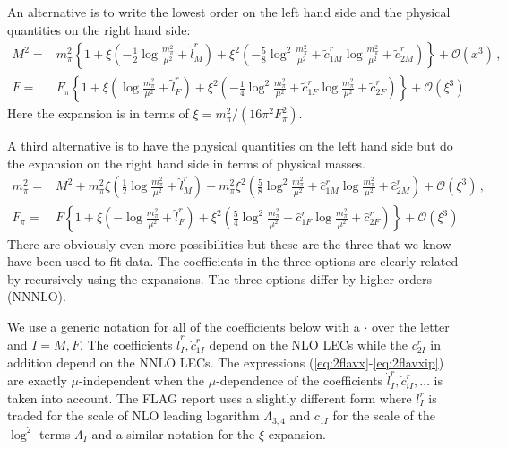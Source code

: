 \documentclass[12pt,a4paper]{article}
\begin{document}
An alternative is to write the lowest order on the left hand side and the physical quantities on the right hand side:
\begin{align}
\label{eq:2flavxi}
M^2 =& m_\pi^2 \left\{ 1 + \xi \left(-\frac{1}{2}\log\frac{m_\pi^2}{\mu^2}+\tilde l_M^r\right)
+ \xi^2 \left(-\frac{5}{8}\log^2\frac{m_\pi^2}{\mu^2}+\tilde c^r_{1M}\log\frac{m_\pi^2}{\mu^2}
+\tilde c^r_{2M}\right) \right\} + \mathcal{O}\left(x^3\right) 
\,,\nonumber\\
F =& F_\pi \left\{ 1 + \xi \left(\log\frac{m_\pi^2}{\mu^2}+\tilde l_F^r\right)
+ \xi^2 \left(-\frac{1}{4}\log^2\frac{m_\pi^2}{\mu^2}+
\tilde c^r_{1F}\log\frac{m_\pi^2}{\mu^2}
+\tilde c^r_{2F}\right) \right\} + \mathcal{O}\left(\xi^3\right)
\end{align}
Here the expansion is in terms of $\xi=m_\pi^2/(16\pi^2 F_\pi^2)$.

A third alternative is to have the physical quantities on the left hand side but do the expansion on the right hand side in terms of physical masses.
\begin{align}
\label{eq:2flavxip}
m_\pi^2 =& M^2 + m_\pi^2 \xi \left(\frac{1}{2}\log\frac{m_\pi^2}{\mu^2}+\hat l_M^r\right)
+ m_\pi^2 \xi^2 \left(\frac{5}{8}\log^2\frac{m_\pi^2}{\mu^2}+\hat c^r_{1M}\log\frac{m_\pi^2}{\mu^2}
+\hat c^r_{2M}\right)+\mathcal{O}\left(\xi^3\right)
\,,\nonumber\\
F_\pi =& F\left\{ 1 + \xi \left(-\log\frac{m_\pi^2}{\mu^2}+\hat l_F^r\right)
+ \xi^2 \left(\frac{5}{4}\log^2\frac{m_\pi^2}{\mu^2}+\hat c^r_{1F}\log\frac{m_\pi^2}{\mu^2}
+\hat c^r_{2F}\right) \right\} +\mathcal{O}\left(\xi^3\right)
\end{align}
There are obviously even more possibilities but these are the three that we know have been used to fit data.
The coefficients in the three options are clearly related by recursively using the expansions. The three options differ by higher orders (NNNLO).

We use a generic notation for all of the coefficients below with a $\cdot$ over the letter and $I=M,F$. The coefficients $\dot l_{I}^r,\dot c_{1I}^r$ depend on the NLO LECs while the $c_{2I}^r$ in addition depend on the NNLO LECs. The expressions (\ref{eq:2flavx}-\ref{eq:2flavxip}) are exactly $\mu$-independent when the $\mu$-dependence of the coefficients $\dot l_{I}^r,\dot c^r_{iI},\ldots$ is taken into account. The FLAG report uses a slightly different form where $l^r_I$ is traded for the scale of NLO leading logarithm $\Lambda_{3,4}$ and $c_{1I}$ for the scale of the $\log^2$ terms $\Lambda_I$ and a similar notation for the $\xi$-expansion.
\end{document}
